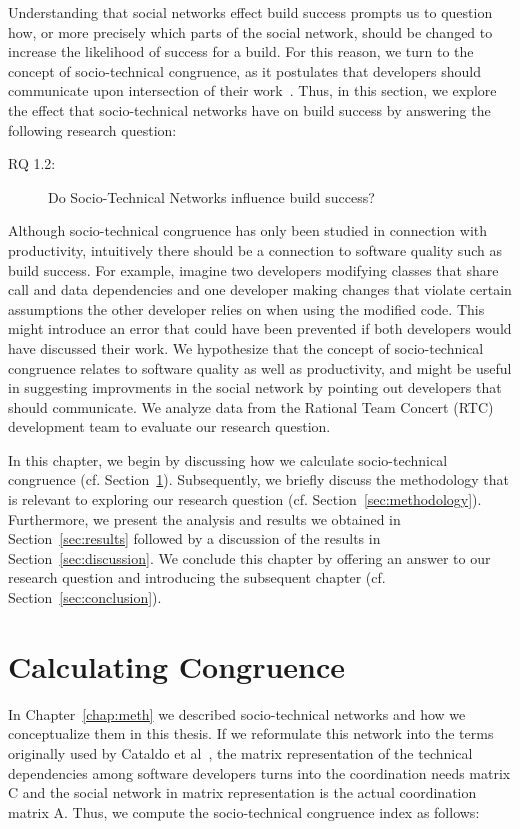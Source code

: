 \label{chap:stc-net2}
Understanding that social networks effect build success prompts us to question how, or more precisely which parts of the social network, should be changed to increase the likelihood of success for a build.
For this reason, we turn to the concept of socio-technical congruence, as it postulates that developers should communicate upon intersection of their work~\cite{kwan:tse:2011}.
Thus, in this section, we explore the effect that socio-technical networks have on build success by answering the following research question:

\begin{description}
  \item[RQ 1.2:] Do Socio-Technical Networks influence build success?
\end{description}

Although socio-technical congruence has only been studied in connection with productivity, intuitively there should be a connection to software quality such as build success.
For example, imagine two developers modifying classes that share call and data dependencies and one developer making changes that violate certain assumptions the other developer relies on when using the modified code.
This might introduce an error that could have been prevented if both developers would have discussed their work.
We hypothesize that the concept of socio-technical congruence relates to software quality as well as productivity, and might be useful in suggesting improvments in the social network by pointing out developers that should communicate.
We analyze data from the Rational Team Concert (RTC) development team to evaluate our research question.

In this chapter, we begin by discussing how we calculate socio-technical congruence (cf. Section~\ref{sec:congruence}).
Subsequently, we briefly discuss the methodology that is relevant to exploring our research question (cf. Section~\ref{sec:methodology}).
Furthermore, we present the analysis and results we obtained in Section~\ref{sec:results} followed by a discussion of the results in Section~\ref{sec:discussion}.
We conclude this chapter by offering an answer to our research question and introducing the subsequent chapter (cf. Section~\ref{sec:conclusion}).


\section{Calculating Congruence}
\label{sec:congruence}
In Chapter~\ref{chap:meth} we described socio-technical networks and how we conceptualize them in this thesis.
If we reformulate this network into the terms originally used by Cataldo et al~\cite{cataldo:cscw:2006}, the matrix representation of the technical dependencies among software developers turns into the coordination needs matrix C and the social network in matrix representation is the actual coordination matrix A.
Thus, we compute the socio-technical congruence index as follows:

